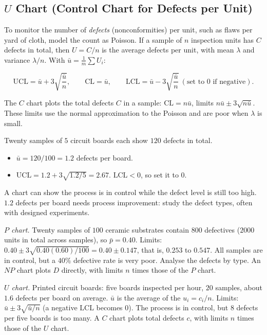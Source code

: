 \subsection{$U$ Chart (Control Chart for Defects per Unit)}

To monitor the number of \emph{defects} (nonconformities) per unit, such as flaws per yard of cloth, model the count as Poisson. If a sample of $n$ inspection units has $C$ defects in total, then $U=C/n$ is the average defects per unit, with mean $\lambda$ and variance $\lambda/n$. With $\bar{u}=\frac1m\sum U_i$:

\begin{theorem}[$U$ chart]\label{thm:uchart}
\[ \mathrm{UCL}=\bar{u}+3\sqrt{\frac{\bar{u}}n},\qquad\mathrm{CL}=\bar{u},\qquad\mathrm{LCL}=\bar{u}-3\sqrt{\frac{\bar{u}}n}\ (\text{set to }0\text{ if negative}). \]
\end{theorem}

The $C$ chart plots the total defects $C$ in a sample: $\mathrm{CL}=n\bar{u}$, limits $n\bar{u}\pm3\sqrt{n\bar{u}}$. These limits use the normal approximation to the Poisson and are poor when $\lambda$ is small.

\begin{example}
Twenty samples of $5$ circuit boards each show $120$ defects in total.
\begin{itemize}
  \item $\bar{u}=120/100=1.2$ defects per board.
  \item $\mathrm{UCL}=1.2+3\sqrt{1.2/5}=2.67$. $\mathrm{LCL}<0$, so set it to $0$.
\end{itemize}
A chart can show the process is in control while the defect level is still too high. $1.2$ defects per board needs process improvement: study the defect types, often with designed experiments.
\end{example}

\begin{example}
\emph{$P$ chart.} Twenty samples of $100$ ceramic substrates contain $800$ defectives ($2000$ units in total across samples), so $\bar{p}=0.40$. Limits: $0.40\pm3\sqrt{0.40(0.60)/100}=0.40\pm0.147$, that is, $0.253$ to $0.547$. All samples are in control, but a $40\%$ defective rate is very poor. Analyse the defects by type. An $NP$ chart plots $D$ directly, with limits $n$ times those of the $P$ chart.

\emph{$U$ chart.} Printed circuit boards: five boards inspected per hour, $20$ samples, about $1.6$ defects per board on average. $\bar{u}$ is the average of the $u_i=c_i/n$. Limits: $\bar{u}\pm3\sqrt{\bar{u}/n}$ (a negative $\mathrm{LCL}$ becomes $0$). The process is in control, but $8$ defects per five boards is too many. A $C$ chart plots total defects $c$, with limits $n$ times those of the $U$ chart.
\end{example}

